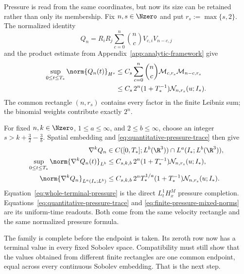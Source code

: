 Pressure is read from the same coordinates, but now its size can be retained
rather than only its membership.  Fix \(n,s\in\Nzero\) and put
\(r_s:=\max\{s,2\}\).  The normalized identity
\[
 Q_n=R_iR_j\sum_{c=0}^{n}\binom ncV_{c,i}V_{n-c,j}
\]
and the product estimate from Appendix~\ref{app:analytic-framework} give
\begin{align}
 \sup_{0\le t\le T_*}\norm{Q_n(t)}_{H^s}
 &\le C_s\sum_{c=0}^{n}\binom nc
 \mathcal M_{c,r_s}\mathcal M_{n-c,r_s}
 \notag\\
 &\le C_s\,2^n(1+T_*^{-1})
 \mathcal N_{n,r_s}(u;I_*).
 \label{eq:quantitative-pressure-trace}
\end{align}
The common rectangle \((n,r_s)\) contains every factor in the finite
Leibniz sum; the binomial weights contribute exactly \(2^n\).

For fixed \(n,k\in\Nzero\), \(1\le a\le\infty\), and
\(2\le b\le\infty\), choose an integer
\(s>k+\frac32-\frac3b\).  Spatial embedding and
\eqref{eq:quantitative-pressure-trace} then give
\begin{equation}
 \begin{aligned}
 \nabla^kQ_n
 &\in C([0,T_*];L^b(\R^3))
 \cap L^a(I_*;L^b(\R^3)),\\
 \sup_{0\le t\le T_*}\norm{\nabla^kQ_n(t)}_{L^b}
 &\le C_{s,k,b}\,2^n(1+T_*^{-1})
 \mathcal N_{n,r_s}(u;I_*),\\
 \norm{\nabla^kQ_n}_{L^a(I_*;L^b)}
 &\le C_{s,k,b}\,2^nT_*^{1/a}(1+T_*^{-1})
 \mathcal N_{n,r_s}(u;I_*).
 \end{aligned}
 \label{eq:finite-pressure-mixed-norms}
\end{equation}
Equation~\eqref{eq:whole-terminal-pressure} is the direct \(L^1_tH^M_x\)
pressure completion.  Equations~\eqref{eq:quantitative-pressure-trace} and
\eqref{eq:finite-pressure-mixed-norms} are its uniform-time readouts.  Both
come from the same velocity rectangle and the same normalized pressure
formula.

The family is complete before the endpoint is taken.  Its zeroth
row now has a terminal value in every fixed Sobolev space.  Compatibility must
still show that the values obtained from different finite rectangles are one
common endpoint, equal across every continuous Sobolev embedding.  That is the
next step.
